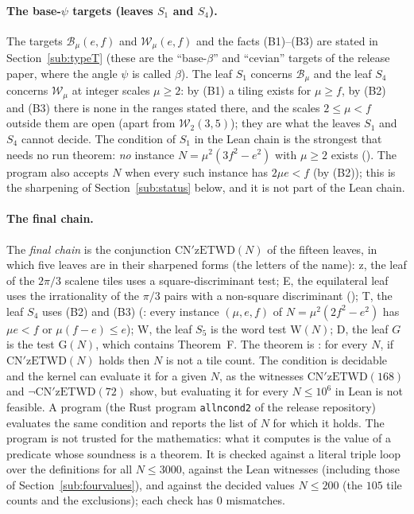 \documentclass[11pt,reqno]{amsart}
\theoremstyle{plain}
\theoremstyle{definition}
\begin{document}
\paragraph{The base-$\psi$ targets (leaves $S_1$ and $S_4$).} The targets $\mathcal B_\mu(e,f)$ and $\mathcal W_\mu(e,f)$ and the facts (B1)--(B3) are stated in Section~\ref{sub:typeT} (these are the ``base-$\beta$'' and ``cevian'' targets of the release paper, where the angle $\psi$ is called $\beta$). The leaf $S_1$ concerns $\mathcal B_\mu$ and the leaf $S_4$ concerns $\mathcal W_\mu$ at integer scales $\mu\ge2$: by (B1) a tiling exists for $\mu\ge f$, by (B2) and (B3) there is none in the ranges stated there, and the scales $2\le\mu<f$ outside them are open (apart from $\mathcal W_2(3,5)$); they are what the leaves $S_1$ and $S_4$ cannot decide.
The condition of $S_1$ in the Lean chain is the strongest that needs no run theorem: \emph{no} instance $N=\mu^2(3f^2-e^2)$ with $\mu\ge2$ exists (). The program also accepts $N$ when every such instance has $2\mu e<f$ (by (B2)); this is the sharpening of Section~\ref{sub:status} below, and it is not part of the Lean chain.

\paragraph{The final chain.}
The \emph{final chain} is the conjunction $\mathrm{CN'zETWD}(N)$ of the fifteen leaves, in which five leaves are in their sharpened forms (the letters of the name): \textup{z}, the leaf of the $2\pi/3$ scalene tiles uses a square-discriminant test;
\textup{E}, the equilateral leaf uses the irrationality of the $\pi/3$ pairs with a non-square discriminant (); \textup{T}, the leaf $S_4$ uses (B2) and (B3) (: every instance $(\mu,e,f)$ of $N=\mu^2(2f^2-e^2)$ has $\mu e<f$ or $\mu(f-e)\le e$);
\textup{W}, the leaf $S_5$ is the word test $\mathrm{W}(N)$; \textup{D}, the leaf $G$ is the test $\mathrm{G}(N)$, which contains Theorem~F. The theorem is : for every $N$, if $\mathrm{CN'zETWD}(N)$ holds then $N$ is not a tile count.
The condition is decidable and the kernel can evaluate it for a given $N$, as the witnesses $\mathrm{CN'zETWD}(168)$ and $\neg\mathrm{CN'zETWD}(72)$ show, but evaluating it for every $N\le10^6$ in Lean is
not feasible. A program (the Rust program \texttt{allncond2} of the release repository) evaluates the same condition and reports the list of $N$ for which it holds. The program is not
trusted for the mathematics: what it computes is the value of a predicate whose soundness is a theorem. It is checked against a literal triple loop over the definitions for all $N\le3000$, against the Lean witnesses (including those of Section~\ref{sub:fourvalues}), and against
the decided values $N\le200$ (the $105$ tile counts and the exclusions); each check has $0$ mismatches.
\end{document}
